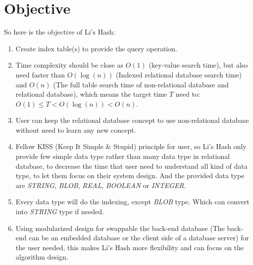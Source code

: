 \chapter{Objective}
\label{chapter:objective}

\baselineskip=26pt
\thispagestyle{empty}

So here is the objective of Li's Hash:

\begin{enumerate}

\item Create index table(s) to provide the query operation.

\item Time complexity should be close as $O(1)$ (key-value search time), but also need faster than $O(\log(n))$ (Indexed relational database search time) and $O(n)$ (The full table search time of non-relational database and relational database), which means the target time $\textit{T}$ need to:\\
$O(1) \leqslant \textit{T} < O(\log(n)) < O(n)$.

\item User can keep the relational database concept to use non-relational database without need to learn any new concept.

\item Fellow KISS (Keep It Simple \& Stupid) principle for user, so Li's Hash only provide few simple data type rather than many data type in relational database, to decrease the time that user need to understand all kind of data type, to let them focus on their system design. And the provided data type are \textit{STRING}, \textit{BLOB}, \textit{REAL}, \textit{BOOLEAN} or \textit{INTEGER}.

\item Every data type will do the indexing, except \textit{BLOB} type. Which can convert into \textit{STRING} type if needed.

\item Using modularized design for swappable the back-end database (The back-end can be an embedded database or the client side of a database server) for the user needed, this makes Li's Hash more flexibility and can focus on the algorithm design.

\end{enumerate}

\clearpage

